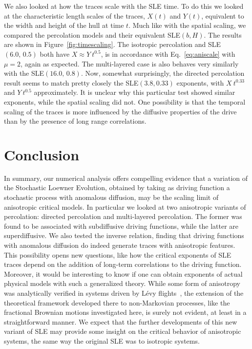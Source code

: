 We also looked at how the traces scale with the SLE time. To do this we looked
at the characteristic length scales of the traces, $X(t)$ and $Y(t)$,
equivalent to the width and height of the hull at time $t$. Much like with the
spatial scaling, we compared the percolation models and their equivalent
SLE$(b,H)$. The results are shown in Figure~\ref{fig:timescaling}. The
isotropic percolation and SLE$(6.0,\, 0.5)$ both have $X\approx Y~t^{0.5}$, is
in accordance with Eq.~\ref{eq:aniscale} with $\mu=2$, again as expected. The
multi-layered case is also behaves very similarly with the SLE$(16.0,\,0.8)$.
Now, somewhat surprisingly, the directed percolation result seems to match
pretty closely the SLE$(3.8, 0.33)$ exponents, with $X~t^{0.33}$ and
$Y~t^{0.5}$ approximately. It is unclear why this particular test showed
similar exponents, while the spatial scaling did not. One possibility is that
the temporal scaling of the traces is more influenced by the diffusive
properties of the drive than by the presence of long range correlations.


\section{Conclusion}
\label{sec:concl}

In summary, our numerical analysis offers compelling evidence that a variation
of the Stochastic Loewner Evolution, obtained by taking as driving function a
stochastic process with anomalous diffusion, may be the scaling limit of
anisotropic critical models. In particular we looked at two anisotropic
variants of percolation: directed percolation and multi-layered percolation.
The former was found to be associated with subdiffusive driving functions,
while the latter are superdiffusive. We also tested the inverse relation,
finding that driving functions with anomalous diffusion do indeed generate
traces with anisotropic features.  This possibility opens new questions, like
how the critical exponents of SLE traces depend on the addition of long-term
correlations to the driving function. Moreover, it would be interesting to know
if one can obtain exponents of actual physical models with such a generalized
theory. While some form of anisotropy was analytically verified in systems
driven by L\'evy flights~\cite{Oikonomou2008}, the extension of the theoretical
framework developed there to non-Markovian processes, like the fractional
Brownian motions investigated here, is surely not evident, at least in a
straightforward manner. We expect that the further developments of this new
variant of SLE may provide some insight on the critical behavior of anisotropic
systems, the same way the original SLE was to isotropic systems.
